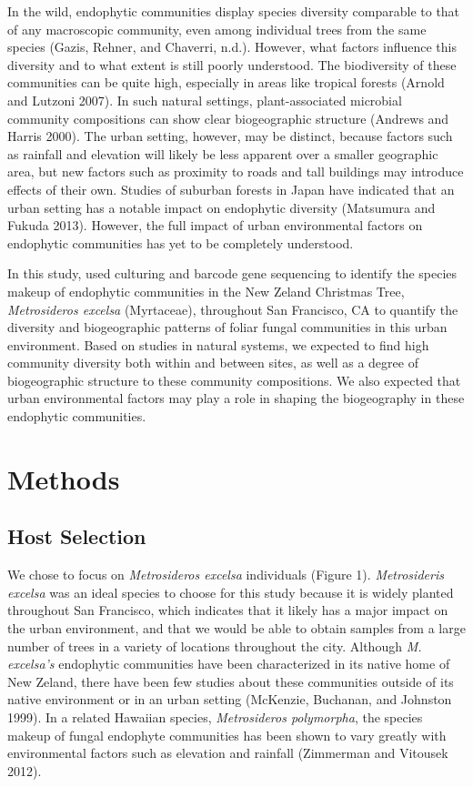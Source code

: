 \documentclass[fleqn,10pt,lineno]{wlpeerj} %
\begin{document}
In the wild, endophytic communities display species diversity comparable
to that of any macroscopic community, even among individual trees from
the same species (Gazis, Rehner, and Chaverri, n.d.). However, what
factors influence this diversity and to what extent is still poorly
understood. The biodiversity of these communities can be quite high,
especially in areas like tropical forests (Arnold and Lutzoni 2007). In
such natural settings, plant-associated microbial community compositions
can show clear biogeographic structure (Andrews and Harris 2000). The
urban setting, however, may be distinct, because factors such as
rainfall and elevation will likely be less apparent over a smaller
geographic area, but new factors such as proximity to roads and tall
buildings may introduce effects of their own. Studies of suburban
forests in Japan have indicated that an urban setting has a notable
impact on endophytic diversity (Matsumura and Fukuda 2013). However, the
full impact of urban environmental factors on endophytic communities has
yet to be completely understood.

In this study, used culturing and barcode gene sequencing to identify
the species makeup of endophytic communities in the New Zeland Christmas
Tree, \emph{Metrosideros excelsa} (Myrtaceae), throughout San Francisco,
CA to quantify the diversity and biogeographic patterns of foliar fungal
communities in this urban environment. Based on studies in natural
systems, we expected to find high community diversity both within and
between sites, as well as a degree of biogeographic structure to these
community compositions. We also expected that urban environmental
factors may play a role in shaping the biogeography in these endophytic
communities.

\hypertarget{methods}{%
\section{Methods}\label{methods}}

\hypertarget{host-selection}{%
\subsection{Host Selection}\label{host-selection}}

We chose to focus on \emph{Metrosideros excelsa} individuals (Figure 1).
\emph{Metrosideris excelsa} was an ideal species to choose for this
study because it is widely planted throughout San Francisco, which
indicates that it likely has a major impact on the urban environment,
and that we would be able to obtain samples from a large number of trees
in a variety of locations throughout the city. Although \emph{M.
excelsa's} endophytic communities have been characterized in its native
home of New Zeland, there have been few studies about these communities
outside of its native environment or in an urban setting (McKenzie,
Buchanan, and Johnston 1999). In a related Hawaiian species,
\emph{Metrosideros polymorpha}, the species makeup of fungal endophyte
communities has been shown to vary greatly with environmental factors
such as elevation and rainfall (Zimmerman and Vitousek 2012).
\end{document}
